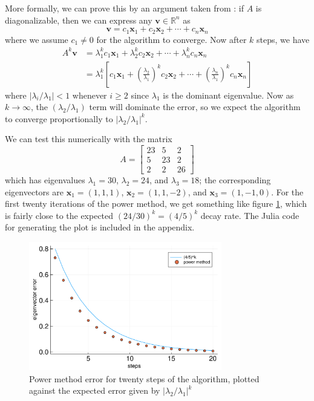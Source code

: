\documentclass{article}
\let\vec\mathbf
\begin{document}
More formally, we can prove this by an argument taken from \cite{mit-sensitivity}: if $A$ is diagonalizable, then we can express any $\vec{v} \in \mathbb{R}^n$ as
\begin{equation*}
  \vec{v} = c_1\vec{x}_1 + c_2\vec{x}_2 + \cdots + c_n\vec{x}_n
\end{equation*}
where we assume $c_1 \neq 0$ for the algorithm to converge. Now after $k$ steps, we have
\begin{align*}
  A^k\vec{v} &= \lambda_1^k c_1\vec{x}_1 + \lambda_2^k c_2\vec{x}_2 + \cdots + \lambda_n^k c_n\vec{x}_n \\
             &= \lambda_1^k \left[c_1\vec{x}_1 + \left(\frac{\lambda_2}{\lambda_1}\right)^k c_2\vec{x}_2 + \cdots + \left(\frac{\lambda_n}{\lambda_1}\right)^k c_n\vec{x}_n\right]
\end{align*}
where $|\lambda_i / \lambda_1| < 1$ whenever $i \ge 2$ since $\lambda_1$ is the dominant eigenvalue. Now as $k \to \infty$, the $(\lambda_2 / \lambda_1)$ term will dominate the error, so we expect the algorithm to converge proportionally to $|\lambda_2 / \lambda_1|^k$.

We can test this numerically with the matrix
\begin{equation*}
  A = \begin{bmatrix}23 & 5 & 2 \\ 5 & 23 & 2 \\ 2 & 2 & 26\end{bmatrix}
\end{equation*}
which has eigenvalues $\lambda_1 = 30$, $\lambda_2 = 24$, and $\lambda_3 = 18$; the corresponding eigenvectors are $\vec{x}_1 = (1,1,1)$, $\vec{x}_2 = (1,1,-2)$, and $\vec{x}_3 = (1,-1,0)$. For the first twenty iterations of the power method, we get something like figure \ref{powermethod-plot}, which is fairly close to the expected $(24/30)^k = (4/5)^k$ decay rate. The Julia code for generating the plot is included in the appendix.

\begin{figure}[H]
  \begin{center}
    \includegraphics[width=0.75\textwidth]{power-method.pdf}
    \caption{Power method error for twenty steps of the algorithm, plotted against the expected error given by $|\lambda_2 / \lambda_1|^k$}
    \label{powermethod-plot}
  \end{center}
\end{figure}
\end{document}
